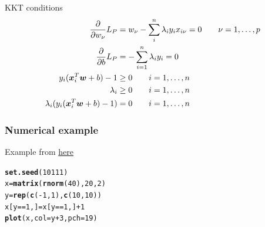 \documentclass[aspectratio=169]{beamer}\usepackage[]{graphicx}\usepackage[]{xcolor}
\makeatletter
\newcommand{\hlnum}[1]{\textcolor[rgb]{0.686,0.059,0.569}{#1}}%
\newcommand{\hlopt}[1]{\textcolor[rgb]{0,0,0}{#1}}%
\newcommand{\hlstd}[1]{\textcolor[rgb]{0.345,0.345,0.345}{#1}}%
\newcommand{\hlkwb}[1]{\textcolor[rgb]{0.69,0.353,0.396}{#1}}%
\newcommand{\hlkwc}[1]{\textcolor[rgb]{0.333,0.667,0.333}{#1}}%
\newcommand{\hlkwd}[1]{\textcolor[rgb]{0.737,0.353,0.396}{\textbf{#1}}}%
\newenvironment{kframe}{%
 \def\at@end@of@kframe{}%
 \ifinner\ifhmode%
  \def\at@end@of@kframe{\end{minipage}}%
  \begin{minipage}{\columnwidth}%
 \fi\fi%
 \def\FrameCommand##1{\hskip\@totalleftmargin \hskip-\fboxsep
 \colorbox{shadecolor}{##1}\hskip-\fboxsep
     \hskip-\linewidth \hskip-\@totalleftmargin \hskip\columnwidth}%
 \MakeFramed {\advance\hsize-\width
   \@totalleftmargin\z@ \linewidth\hsize
   \@setminipage}}%
 {\par\unskip\endMakeFramed%
 \at@end@of@kframe}
\newenvironment{knitrout}{}{} %
\makeatother
\begin{document}
\begin{frame}{KKT conditions}
    \begin{align*}
        \frac{\partial}{\partial w_\nu}L_P &=
        w_\nu-\sum_{i}^n\lambda_iy_ix_{i\nu}=0
        \qquad\nu=1,\ldots,p \\
        \frac{\partial}{\partial b}L_P &=
        -\sum_{i=1}^n \lambda_iy_i = 0 \\
        y_i(\bm{x}_i^T\bm{w}+b)-1 &\geq 0\qquad i=1,\ldots,n \\
        \lambda_i &\geq 0\qquad i=1,\ldots,n \\
        \lambda_i(y_i(\bm{x}_i^T\bm{w}+b)-1) &=0\qquad i=1,\ldots,n \\
    \end{align*}
\end{frame}


\begin{frame}[fragile]\frametitle{Numerical example}
Example from \href{https://www.datacamp.com/tutorial/support-vector-machines-r}{here}
\vfill
\begin{knitrout}
\color{fgcolor}\begin{kframe}
\begin{alltt}
\hlkwd{set.seed}\hlstd{(}\hlnum{10111}\hlstd{)}
\hlstd{x} \hlkwb{=} \hlkwd{matrix}\hlstd{(}\hlkwd{rnorm}\hlstd{(}\hlnum{40}\hlstd{),} \hlnum{20}\hlstd{,} \hlnum{2}\hlstd{)}
\hlstd{y} \hlkwb{=} \hlkwd{rep}\hlstd{(}\hlkwd{c}\hlstd{(}\hlopt{-}\hlnum{1}\hlstd{,} \hlnum{1}\hlstd{),} \hlkwd{c}\hlstd{(}\hlnum{10}\hlstd{,} \hlnum{10}\hlstd{))}
\hlstd{x[y} \hlopt{==} \hlnum{1}\hlstd{,]} \hlkwb{=} \hlstd{x[y} \hlopt{==} \hlnum{1}\hlstd{,]} \hlopt{+} \hlnum{1}
\hlkwd{plot}\hlstd{(x,} \hlkwc{col} \hlstd{= y} \hlopt{+} \hlnum{3}\hlstd{,} \hlkwc{pch} \hlstd{=} \hlnum{19}\hlstd{)}
\end{alltt}
\end{kframe}
\end{knitrout}
\end{frame}

\end{document}
